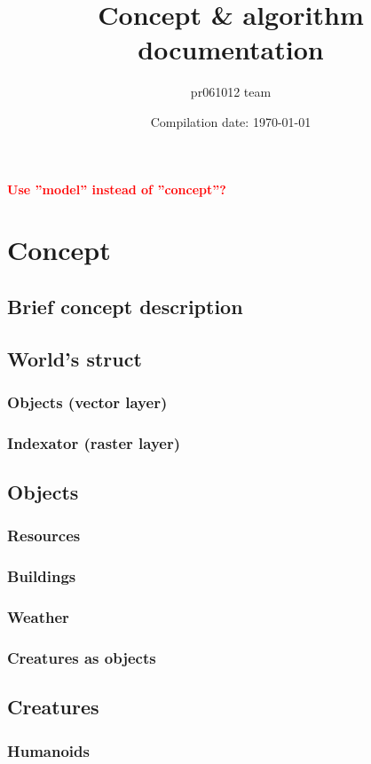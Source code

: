 \documentclass[12pt]{article}
\title{Concept \& algorithm documentation}
\author{pr061012 team}
\date{Compilation date: \today}
\newcommand{\todo}[1]
{
    \marginpar
    {
        \textbf{\small{\textcolor{red}{#1}}}
    }
}
\begin{document}
    \maketitle

	\todo{Use ''model'' instead of ''concept''?}

	\section{Concept}
		\subsection{Brief concept description}
		\subsection{World's struct}
			\subsubsection{Objects (vector layer)}
			\subsubsection{Indexator (raster layer)}
		\subsection{Objects}
			\subsubsection{Resources}
			\subsubsection{Buildings}
			\subsubsection{Weather}
			\subsubsection{Creatures as objects}
		\subsection{Creatures}
			\subsubsection{Humanoids}
\end{document}
